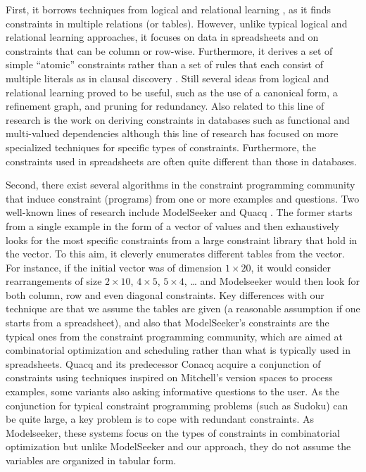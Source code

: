 \documentclass{IEEEtran}
\theoremstyle{definition}
\begin{document}
First, it borrows techniques from logical and relational learning \cite{luc_book}, as it finds
constraints in multiple relations (or tables). However, unlike typical logical and relational learning
approaches, it focuses on data in spreadsheets and on constraints that can be column or row-wise.
Furthermore, it derives a set of simple “atomic” constraints rather than a set of rules that each consist of multiple literals as in clausal discovery \cite{claudien,Llalouet}. Still several ideas from logical and relational learning
proved to be useful, such as the use of a canonical form, a refinement graph, and pruning for redundancy.
Also related to this line of research is the work on deriving constraints in databases such as functional and multi-valued dependencies \cite{savnik, Mannila-Raiha}
although this line of research has focused on more specialized techniques for specific types of constraints. Furthermore, the constraints used
in spreadsheets are often quite different than those in databases.


Second, there exist several algorithms in the constraint programming community that induce constraint (programs)
from one or more examples and questions. Two well-known lines of research include ModelSeeker \cite{modelseeker} and Quacq \cite{Quacq}.
The former starts from a single example in the form of a vector of values and then exhaustively looks for the most specific constraints from a large constraint library that hold in the vector. To this aim, it cleverly enumerates different tables from the vector. For instance, if the initial vector was of dimension $1 \times 20$, it would consider rearrangements of size $2 \times 10$, $4 \times 5$, $5 \times 4$, … and Modelseeker would then look for both column, row  and even diagonal constraints. Key differences with our technique are that we assume the tables are given (a reasonable assumption if one starts from a spreadsheet), and also that ModelSeeker’s constraints are the typical ones from the constraint programming community, which are aimed at combinatorial optimization and scheduling rather than what is typically used in spreadsheets. Quacq \cite{Quacq} and its predecessor Conacq \cite{Conacq} acquire a conjunction of constraints using techniques inspired on Mitchell’s version spaces to process examples, some variants also asking informative questions to the user. As the conjunction for typical constraint programming problems (such as Sudoku) can be quite large, a key problem is to cope with redundant constraints.   As Modelseeker, these systems focus on the types of constraints in combinatorial optimization but unlike ModelSeeker and our approach, they do not assume the variables are organized in tabular form.
\end{document}
